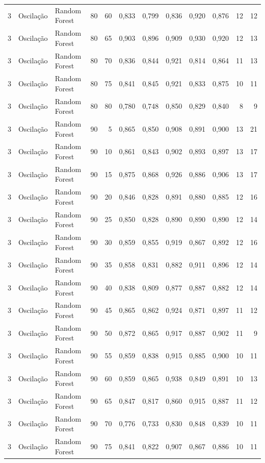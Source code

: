 \begin{longtable}{@{}rllrrrrrrrrr@{}}
3 & Oscilação & Random Forest & 80 & 60 & 0,833 & 0,799 & 0,836 & 0,920 & 0,876 & 12 & 12 \\
3 & Oscilação & Random Forest & 80 & 65 & 0,903 & 0,896 & 0,909 & 0,930 & 0,920 & 12 & 13 \\
3 & Oscilação & Random Forest & 80 & 70 & 0,836 & 0,844 & 0,921 & 0,814 & 0,864 & 11 & 13 \\
3 & Oscilação & Random Forest & 80 & 75 & 0,841 & 0,845 & 0,921 & 0,833 & 0,875 & 10 & 11 \\
3 & Oscilação & Random Forest & 80 & 80 & 0,780 & 0,748 & 0,850 & 0,829 & 0,840 & 8 & 9 \\
3 & Oscilação & Random Forest & 90 & 5 & 0,865 & 0,850 & 0,908 & 0,891 & 0,900 & 13 & 21 \\
3 & Oscilação & Random Forest & 90 & 10 & 0,861 & 0,843 & 0,902 & 0,893 & 0,897 & 13 & 17 \\
3 & Oscilação & Random Forest & 90 & 15 & 0,875 & 0,868 & 0,926 & 0,886 & 0,906 & 13 & 17 \\
3 & Oscilação & Random Forest & 90 & 20 & 0,846 & 0,828 & 0,891 & 0,880 & 0,885 & 12 & 16 \\
3 & Oscilação & Random Forest & 90 & 25 & 0,850 & 0,828 & 0,890 & 0,890 & 0,890 & 12 & 14 \\
3 & Oscilação & Random Forest & 90 & 30 & 0,859 & 0,855 & 0,919 & 0,867 & 0,892 & 12 & 16 \\
3 & Oscilação & Random Forest & 90 & 35 & 0,858 & 0,831 & 0,882 & 0,911 & 0,896 & 12 & 14 \\
3 & Oscilação & Random Forest & 90 & 40 & 0,838 & 0,809 & 0,877 & 0,887 & 0,882 & 12 & 14 \\
3 & Oscilação & Random Forest & 90 & 45 & 0,865 & 0,862 & 0,924 & 0,871 & 0,897 & 11 & 12 \\
3 & Oscilação & Random Forest & 90 & 50 & 0,872 & 0,865 & 0,917 & 0,887 & 0,902 & 11 & 9 \\
3 & Oscilação & Random Forest & 90 & 55 & 0,859 & 0,838 & 0,915 & 0,885 & 0,900 & 10 & 11 \\
3 & Oscilação & Random Forest & 90 & 60 & 0,859 & 0,865 & 0,938 & 0,849 & 0,891 & 10 & 13 \\
3 & Oscilação & Random Forest & 90 & 65 & 0,847 & 0,817 & 0,860 & 0,915 & 0,887 & 11 & 12 \\
3 & Oscilação & Random Forest & 90 & 70 & 0,776 & 0,733 & 0,830 & 0,848 & 0,839 & 10 & 11 \\
3 & Oscilação & Random Forest & 90 & 75 & 0,841 & 0,822 & 0,907 & 0,867 & 0,886 & 10 & 11 \\

\end{longtable}
